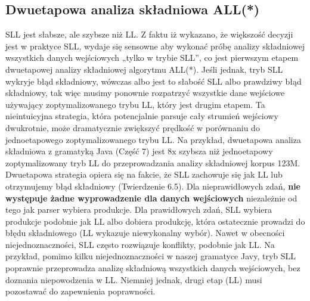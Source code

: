 \subsection{Dwuetapowa analiza składniowa ALL(*)}
SLL jest słabsze, ale szybsze niż LL.
Z faktu iż wykazano, że większość decyzji jest w praktyce SLL, wydaje się
sensowne aby wykonać próbę analizy składniowej wszystkich danych wejściowych
„tylko w trybie SLL”, co jest pierwszym etapem dwuetapowej analizy składniowej algorytmu ALL(*).
Jeśli jednak, tryb SLL wykryje błąd składniowy, wówczas albo jest to słabość SLL
albo prawdziwy błąd składniowy, tak więc musimy ponownie rozpatrzyć wszystkie
dane wejściowe używający zoptymalizowanego trybu LL, który jest drugim etapem.
Ta nieintuicyjna strategia, która potencjalnie parsuje cały strumień wejściowy dwukrotnie,
może dramatycznie zwiększyć prędkość w porównaniu do jednoetapowego zoptymalizowanego trybu LL.
Na przykład, dwuetapowa analiza składniowa z gramatyką Java (Część 7) jest 8x szybsza
niż jednoetapowy zoptymalizowany tryb LL do przeprowadzania analizy składniowej korpus 123M.
Dwuetapowa strategia opiera się na fakcie, że SLL zachowuje się jak LL
lub otrzymujemy błąd składniowy (Twierdzenie 6.5).
Dla nieprawidłowych zdań, \textbf{nie występuje żadne wyprowadzenie dla danych
wejściowych} niezależnie od tego jak parser wybiera produkcje.
Dla prawidłowych zdań, SLL wybiera produkcje podobnie jak LL albo dobiera produkcję,
która ostatecznie prowadzi do błędu składniowego (LL wykazuje niewykonalny wybór).
Nawet w obecności niejednoznaczności, SLL często rozwiązuje konflikty, podobnie jak LL.
Na przykład, pomimo kilku niejednoznaczności w naszej gramatyce Javy, tryb SLL
poprawnie przeprowadza analizę składniową wszystkich danych wejściowych,
bez doznania niepowodzenia w LL. Niemniej jednak,
drugi etap (LL) musi pozostawać do zapewnienia poprawności.
